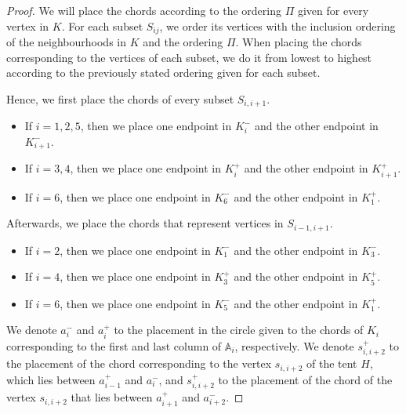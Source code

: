 \documentclass[12pt]{book}
\theoremstyle{plain}
\theoremstyle{remark}
\begin{document}
\begin{proof}
\vspace{2mm}
We will place the chords according to the ordering $\Pi$ given for every vertex in $K$. For each subset $S_{ij}$, we order its vertices with the inclusion ordering of the neighbourhoods in $K$ and the ordering $\Pi$. When placing the chords corresponding to the vertices of each subset, we do it from lowest to highest according to the previously stated ordering given for each subset.

Hence, we first place the chords of every subset $S_{i,i+1}$.
\begin{itemize}
	\item If $i =1, 2, 5$, then we place one endpoint in $K_i^-$ and the other endpoint in $K_{i+1}^-$. 
	\item If $i =3, 4$, then we place one endpoint in $K_i^+$ and the other endpoint in $K_{i+1}^+$. 
	\item If $i = 6$, then we place one endpoint in $K_6^-$ and the other endpoint in $K_1^+$.  
\end{itemize}
Afterwards, we place the chords that represent vertices in $S_{i-1, i+1}$.
\begin{itemize}
	\item If $i = 2$, then we place one endpoint in $K_1^-$ and the other endpoint in $K_3^-$. 
	\item If $i =4$, then we place one endpoint in $K_3^+$ and the other endpoint in $K_5^+$. 
	\item If $i =6$, then we place one endpoint in $K_5^-$ and the other endpoint in $K_1^+$. 
\end{itemize}

We denote $a_i^-$ and $a_i^+$ to the placement in the circle given to the chords of $K_i$ %
corresponding to the first and last column of $\mathbb A_i$, respectively.
We denote $s_{i,i+2}^+$ to the placement of the chord corresponding to the vertex $s_{i,i+2}$ of the tent $H$, which lies between $a_{i-1}^+$ and $a_i^-$, and $s_{i,i+2}^+$ to the placement of the chord of the vertex $s_{i, i+2}$ that lies between $a_{i+1}^+$ and $a_{i+2}^-$.



\end{proof}
\end{document}
